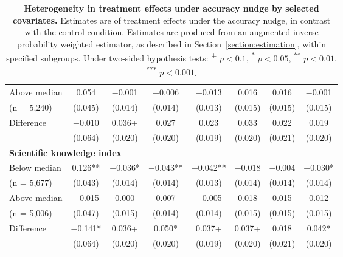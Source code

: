 \documentclass[letterpaper, 12pt, parskip=full,DIV=10]{scrartcl}
\begin{document}
\begin{table}[H]
{\begin{tabular}{lccccccc}
\hspace{1em} Above median	&	\num{0.054}	&	\num{-0.001}	&	\num{-0.006}	&	\num{-0.013}	&	\num{0.016}	&	\num{0.016}	&	\num{-0.001}\\
\hspace{1.5em} (n = 5,240)	&	(\num{0.045})	&	(\num{0.014})	&	(\num{0.014})	&	(\num{0.013})	&	(\num{0.015})	&	(\num{0.015})	&	(\num{0.015})\\
\cmidrule(lr){2-8}														
\hspace{1em} Difference	&	\num{-0.010}	&	\num{0.036}+	&	\num{0.027}	&	\num{0.023}	&	\num{0.033}	&	\num{0.022}	&	\num{0.019}\\
\hspace{1.5em}	&	(\num{0.064})	&	(\num{0.020})	&	(\num{0.020})	&	(\num{0.019})	&	(\num{0.020})	&	(\num{0.021})	&	(\num{0.020})\\
\multicolumn{4}{l}{\textbf{Scientific knowledge index }}  \rule{0pt}{1.2\normalbaselineskip}\\														
\hspace{1em}   Below median	&	\num{0.126}**	&	\num{-0.036}*	&	\num{-0.043}**	&	\num{-0.042}**	&	\num{-0.018}	&	\num{-0.004}	&	\num{-0.030}*\\
\hspace{1.5em} (n = 5,677)	&	(\num{0.043})	&	(\num{0.014})	&	(\num{0.014})	&	(\num{0.013})	&	(\num{0.014})	&	(\num{0.014})	&	(\num{0.014})\\
\hspace{1em}   Above median	&	\num{-0.015}	&	\num{0.000}	&	\num{0.007}	&	\num{-0.005}	&	\num{0.018}	&	\num{0.015}	&	\num{0.012}\\
\hspace{1.5em}  (n = 5,006)	&	(\num{0.047})	&	(\num{0.015})	&	(\num{0.014})	&	(\num{0.014})	&	(\num{0.015})	&	(\num{0.015})	&	(\num{0.015})\\
\cmidrule(lr){2-8}														
\hspace{1em}   Difference	&	\num{-0.141}*	&	\num{0.036}+	&	\num{0.050}*	&	\num{0.037}+	&	\num{0.037}+	&	\num{0.018}	&	\num{0.042}*\\
\hspace{1.5em}	&	(\num{0.064})	&	(\num{0.020})	&	(\num{0.020})	&	(\num{0.019})	&	(\num{0.020})	&	(\num{0.021})	&	(\num{0.020})\\
    \end{tabular}
   }
   \caption{\textbf{Heterogeneity in treatment effects under accuracy nudge by selected covariates.} Estimates are of treatment effects under the accuracy nudge, in contrast with the control condition. Estimates are produced from an augmented inverse probability weighted estimator, as described in Section~\ref{section:estimation}, within specified subgroups. Under two-sided hypothesis tests: \textsuperscript{+} $p<0.1$, \textsuperscript{*} $p < 0.05$, \textsuperscript{**} $p < 0.01$, \textsuperscript{***} $p < 0.001$.}
  \label{tab:heterogeneity_treatment_accuracy}
\end{table}
\end{document}
